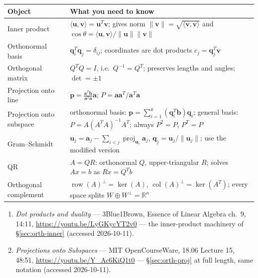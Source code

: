 \begin{center}
\begin{tabularx}{\textwidth}{l>{\raggedright\arraybackslash}X}
\toprule
\textbf{Object} & \textbf{What you need to know}\\
\midrule
Inner product & $\langle\mathbf u,\mathbf v\rangle=\mathbf u^{T}\mathbf v$;
gives norm $\|\mathbf v\|=\sqrt{\langle\mathbf v,\mathbf v\rangle}$ and
$\cos\theta=\langle\mathbf u,\mathbf v\rangle/\|\mathbf u\|\|\mathbf v\|$ \\
Orthonormal basis & $\mathbf q_i^{T}\mathbf q_j=\delta_{ij}$; coordinates are
dot products $c_j=\mathbf q_j^{T}\mathbf v$ \\
Orthogonal matrix & $Q^{T}Q=I$, i.e.\ $Q^{-1}=Q^{T}$; preserves lengths
and angles; $\det=\pm1$ \\
Projection onto line & $\mathbf p=\frac{\mathbf a^{T}\mathbf b}{\mathbf a^{T}\mathbf a}\mathbf a$;
$P=\mathbf a\mathbf a^{T}/\mathbf a^{T}\mathbf a$ \\
Projection onto subspace & orthonormal basis:
$\mathbf p=\sum_{i=1}^{k}(\mathbf q_i^{T}\mathbf b)\mathbf q_i$; general basis:
$P=A(A^{T}A)^{-1}A^{T}$; always $P^2=P$, $P^{T}=P$ \\
Gram--Schmidt & $\mathbf u_j=\mathbf a_j-\sum_{i<j}\operatorname{proj}_{\mathbf u_i}\mathbf a_j$,
$\mathbf q_j=\mathbf u_j/\|\mathbf u_j\|$; use the modified version \\
QR & $A=QR$: orthonormal $Q$, upper-triangular $R$; solves
$Ax=b$ as $Rx=Q^{T}b$ \\
Orthogonal complement & $\operatorname{row}(A)^{\perp}=\ker(A)$,
$\operatorname{col}(A)^{\perp}=\ker(A^{T})$; every space splits
$W\oplus W^\perp=\mathbb R^n$ \\
\bottomrule
\end{tabularx}
\end{center}
\begin{rulebox}
\begin{enumerate}
\item \emph{Dot products and duality} --- 3Blue1Brown, Essence of
Linear Algebra ch.~9, 14:11, \url{https://youtu.be/LyGKycYT2v0} ---
the inner-product machinery of \S\ref{sec:orth-inner}
(accessed 2026-10-11).
\item \emph{Projections onto Subspaces} --- MIT OpenCourseWare, 18.06
Lecture 15, 48:51, \url{https://youtu.be/Y_Ac6KiQ1t0} ---
\S\ref{sec:orth-proj} at full length, same notation
(accessed 2026-10-11).
\end{enumerate}
\end{rulebox}

